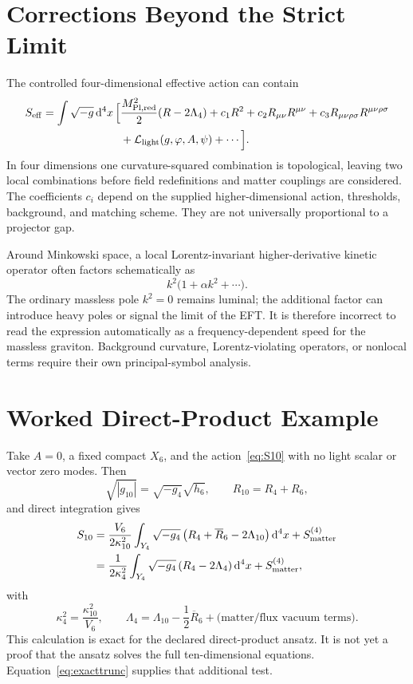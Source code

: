 \documentclass[11pt,a4paper]{article}
\theoremstyle{definition}
\theoremstyle{remark}
\newcommand{\dd}{\mathrm d}
\newcommand{\eff}{\mathrm{eff}}
\begin{document}
\section{Corrections Beyond the Strict Limit}

The controlled four-dimensional effective action can contain
\begin{align}
 S_{\eff}
 =\int\sqrt{-g}\,\dd^4x\,
 \Big[
 &\frac{M_{\rm Pl,red}^{2}}{2}(R-2\Lambda_4)
 +c_1R^2+c_2R_{\mu\nu}R^{\mu\nu}
 +c_3R_{\mu\nu\rho\sigma}R^{\mu\nu\rho\sigma}
 \nonumber\\
 &+\mathcal L_{\rm light}(g,\varphi,A,\psi)+\cdots
 \Big].
\label{eq:EFT}
\end{align}
In four dimensions one curvature-squared combination is topological, leaving
two local combinations before field redefinitions and matter couplings are
considered.  The coefficients \(c_i\) depend on the supplied
higher-dimensional action, thresholds, background, and matching scheme.
They are not universally proportional to a projector gap.

Around Minkowski space, a local Lorentz-invariant higher-derivative kinetic
operator often factors schematically as
\[
 k^2\bigl(1+\alpha k^2+\cdots\bigr).
\]
The ordinary massless pole \(k^2=0\) remains luminal; the additional factor
can introduce heavy poles or signal the limit of the EFT.  It is therefore
incorrect to read the expression automatically as a frequency-dependent
speed for the massless graviton.  Background curvature, Lorentz-violating
operators, or nonlocal terms require their own principal-symbol analysis.

\section{Worked Direct-Product Example}

Take \(A=0\), a fixed compact \(X_6\), and the action~\eqref{eq:S10} with no
light scalar or vector zero modes.  Then
\[
 \sqrt{|g_{10}|}=\sqrt{-g_4}\sqrt{h_6},
\qquad
 R_{10}=R_4+R_6,
\]
and direct integration gives
\begin{align}
 S_{10}
 &=
 \frac{V_6}{2\kappa_{10}^2}
 \int_{Y_4}\sqrt{-g_4}\,
 \bigl(R_4+\overline R_6-2\Lambda_{10}\bigr)\,\dd^4x
 +S_{\rm matter}^{(4)}
\nonumber\\
 &=
 \frac{1}{2\kappa_4^2}
 \int_{Y_4}\sqrt{-g_4}\,
 (R_4-2\Lambda_4)\,\dd^4x
 +S_{\rm matter}^{(4)},
\end{align}
with
\[
 \kappa_4^2=\frac{\kappa_{10}^2}{V_6},
\qquad
 \Lambda_4=\Lambda_{10}-\frac12\overline R_6
 +\text{(matter/flux vacuum terms)}.
\]
This calculation is exact for the declared direct-product ansatz.  It is not
yet a proof that the ansatz solves the full ten-dimensional equations.
Equation~\eqref{eq:exacttrunc} supplies that additional test.
\end{document}
